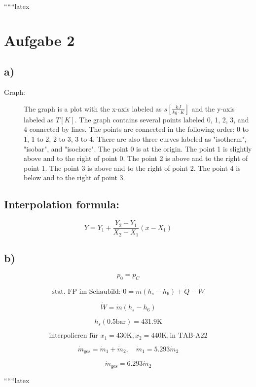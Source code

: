 
``````latex


\section*{Aufgabe 2}

\subsection*{a)}

\begin{description}
    \item[Graph:] 
    The graph is a plot with the x-axis labeled as $s \left[ \frac{kJ}{kg \cdot K} \right]$ and the y-axis labeled as $T \left[ K \right]$. The graph contains several points labeled 0, 1, 2, 3, and 4 connected by lines. The points are connected in the following order: 0 to 1, 1 to 2, 2 to 3, 3 to 4. There are also three curves labeled as "isotherm", "isobar", and "isochore". The point 0 is at the origin. The point 1 is slightly above and to the right of point 0. The point 2 is above and to the right of point 1. The point 3 is above and to the right of point 2. The point 4 is below and to the right of point 3.
\end{description}

\subsection*{Interpolation formula:}

\[
Y = Y_1 + \frac{Y_2 - Y_1}{X_2 - X_1} (x - X_1)
\]

\subsection*{b)}

\[
p_0 = p_C
\]

\[
\text{stat. FP im Schaubild: } 0 = \dot{m} (h_s - h_6) + \dot{Q} - \dot{W}
\]

\[
\dot{W} = \dot{m} (h_s - h_6)
\]

\[
h_s (0.5 \text{bar}) = 431.9 \text{K}
\]

\[
\text{interpolieren für } x_1 = 430 \text{K}, x_2 = 440 \text{K}, \text{in TAB-A22}
\]

\[
\dot{m}_{\text{ges}} = \dot{m}_1 + \dot{m}_2, \quad \dot{m}_1 = 5.293 \dot{m}_2
\]

\[
\dot{m}_{\text{ges}} = 6.293 \dot{m}_2
\]

``````latex


